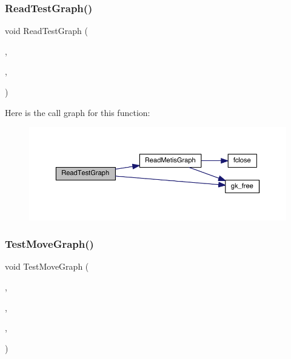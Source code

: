 \subsubsection{\texorpdfstring{Read\+Test\+Graph()}{ReadTestGraph()}}
{\footnotesize\ttfamily void Read\+Test\+Graph (\begin{DoxyParamCaption}\item[{\hyperlink{a00734}{graph\+\_\+t} $\ast$}]{,  }\item[{char $\ast$}]{,  }\item[{M\+P\+I\+\_\+\+Comm}]{ }\end{DoxyParamCaption})}

Here is the call graph for this function\+:\nopagebreak
\begin{figure}[H]
\begin{center}
\leavevmode
\includegraphics[width=350pt]{a00954_ad576773d5c2e0a0662e8913264b980b1_cgraph}
\end{center}
\end{figure}
\mbox{\label{a00954_a646249107ea9150124408b418ad61f15}} 
\subsubsection{\texorpdfstring{Test\+Move\+Graph()}{TestMoveGraph()}}
{\footnotesize\ttfamily void Test\+Move\+Graph (\begin{DoxyParamCaption}\item[{\hyperlink{a00734}{graph\+\_\+t} $\ast$}]{,  }\item[{\hyperlink{a00734}{graph\+\_\+t} $\ast$}]{,  }\item[{\hyperlink{a00876_aaa5262be3e700770163401acb0150f52}{idx\+\_\+t} $\ast$}]{,  }\item[{M\+P\+I\+\_\+\+Comm}]{ }\end{DoxyParamCaption})}

